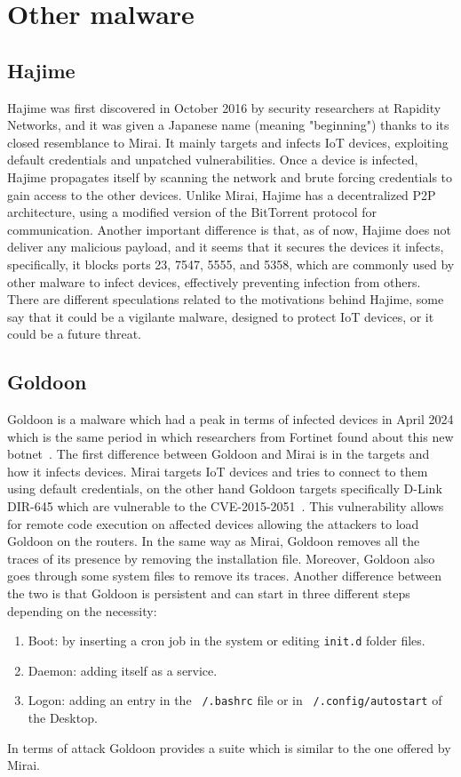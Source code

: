 \chapter{Other malware}

\section{Hajime}

Hajime was first discovered in October 2016 by security researchers at Rapidity Networks, and it was given a Japanese name (meaning "beginning") thanks to its closed resemblance to Mirai. It mainly targets and infects IoT devices, exploiting default credentials and unpatched vulnerabilities. Once a device is infected, Hajime propagates itself by scanning the network and brute forcing credentials to gain access to the other devices. Unlike Mirai, Hajime has a decentralized P2P architecture, using a modified version of the BitTorrent protocol for communication. Another important difference is that, as of now, Hajime does not deliver any malicious payload, and it seems that it secures the devices it infects, specifically, it blocks ports 23, 7547, 5555, and 5358, which are commonly used by other malware to infect devices, effectively preventing infection from others. There are different speculations related to the motivations behind Hajime, some say that it could be a vigilante malware, designed to protect IoT devices, or it could be a future threat.

\section{Goldoon}
Goldoon is a malware which had a peak in terms of infected devices in April 2024 which is the same period in which researchers from Fortinet found about this new botnet~\cite{fortinet-goldoon}. The first difference between Goldoon and Mirai is in the targets and how it infects devices. Mirai targets IoT devices and tries to connect to them using default credentials, on the other hand Goldoon targets specifically D-Link DIR-645 which are vulnerable to the CVE-2015-2051~\cite{CVE-2015-2051}. This vulnerability allows for remote code execution on affected devices allowing the attackers to load Goldoon on the routers. In the same way as Mirai, Goldoon removes all the traces of its presence by removing the installation file. Moreover, Goldoon also goes through some system files to remove its traces. Another difference between the two is that Goldoon is persistent and can start in three different steps depending on the necessity:
\begin{enumerate}
    \item Boot: by inserting a cron job in the system or editing \texttt{init.d} folder files.
    \item Daemon: adding itself as a service.
    \item Logon: adding an entry in the \texttt{~/.bashrc} file or in \texttt{~/.config/autostart} of the Desktop.
\end{enumerate}
In terms of attack Goldoon provides a suite which is similar to the one offered by Mirai.

